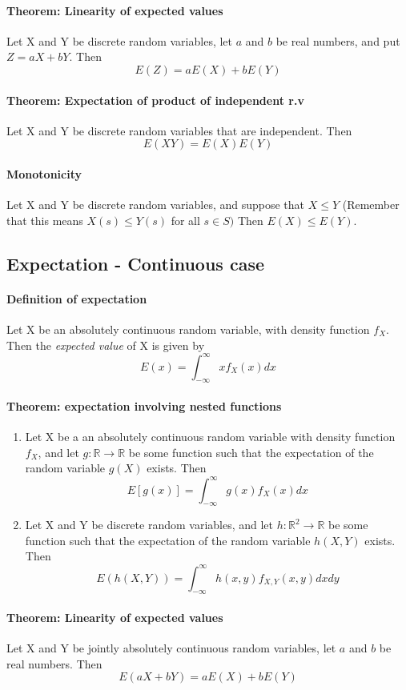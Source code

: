 \documentclass[11pt]{article}
\newcommand{\ti}[1]{\textit{#1}}
\newcommand{\mb}[1]{\mathbb{#1}}
\begin{document}
\paragraph{Theorem: Linearity of expected values} Let X and Y be discrete random variables, let $a$ and $b$ be real numbers, and put $Z = aX + bY$. Then $$E(Z) = aE(X) + bE(Y)$$
\paragraph{Theorem: Expectation of product of independent r.v}Let X and Y be discrete random variables that are independent. Then $$E(XY) = E(X)E(Y)$$
\paragraph{Monotonicity} Let X and Y be discrete random variables, and suppose that $X \leq Y$ (Remember that this means $X(s) \leq Y(s)$ for all $s\in S)$ Then $E(X) \leq E(Y)$.
\subsection{Expectation - Continuous case}
\paragraph{Definition of expectation} Let X be an absolutely continuous random variable, with density function $f_X$. Then the \ti{expected value} of X is given by
$$ E(x) = \int_{-\infty}^{\infty}xf_X(x)dx$$
\paragraph{Theorem: expectation involving nested functions} 
\begin{enumerate}
\item Let X be a an absolutely continuous random variable with density function $f_X$, and let $g: \mb{R} \rightarrow \mb{R}$ be some function such that the expectation of the random variable $g(X)$ exists. Then $$E[g(x)]=\int_{-\infty}^{\infty} g(x)f_X(x)dx$$
\item Let X and Y be discrete random variables, and let $h: \mb{R}^2 \rightarrow \mb{R}$ be some function such that the expectation of the random variable $h(X,Y)$ exists. Then
 $$E(h(X,Y)) = \int_{-\infty}^{\infty}h(x,y)f_{X,Y}(x,y)dxdy$$
 \end{enumerate}
 \paragraph{Theorem: Linearity of expected values} Let X and Y be jointly absolutely continuous random variables, let $a$ and $b$ be real numbers. Then $$E(aX + bY) = aE(X) + bE(Y)$$
\end{document}
